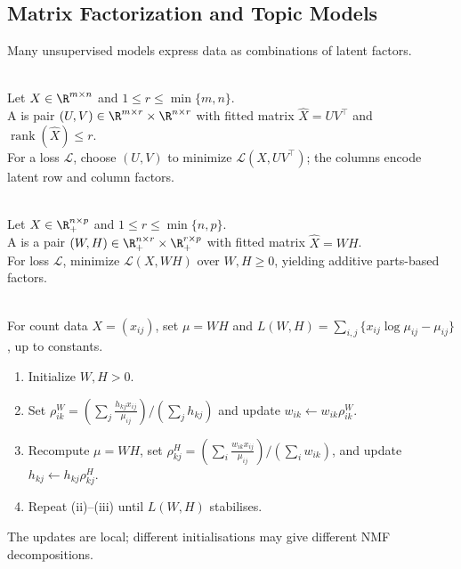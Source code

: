 \subsection{Matrix Factorization and Topic Models}

Many unsupervised models express data as combinations of latent factors.

\begin{definition} \label{def:sl-low-rank-matrix-factorization} \\
Let $X\in\R^{m\times n}$ and $1\leq r\leq\min\{m,n\}$.\\
A  is pair $(U,V)\in\R^{m\times r}\times\R^{n\times r}$ with fitted matrix $\widehat{X}=UV^\top$ and $\operatorname{rank}(\widehat{X})\leq r$.\\
For a loss $\mathcal{L}$, choose $(U,V)$ to minimize $\mathcal{L}(X,UV^\top)$; the columns encode latent row and column factors.
\end{definition}

\begin{definition} \label{def:sl-nonnegative-matrix-factorization} \\
Let $X\in\R_+^{n\times p}$ and $1\leq r\leq\min\{n,p\}$.\\
A  is a pair $(W,H)\in\R_+^{n\times r}\times\R_+^{r\times p}$ with fitted matrix $\widehat{X}=WH$.\\
For loss $\mathcal{L}$, minimize $\mathcal{L}(X,WH)$ over $W,H\geq0$, yielding additive parts-based factors.
\end{definition}

\begin{method} \label{meth:sl-poisson-nmf-multiplicative-updates} \\
For count data $X=(x_{ij})$, set $\mu=WH$ and $L(W,H)=\sum\limits_{i,j}\{x_{ij}\log\mu_{ij}-\mu_{ij}\}$, up to constants.
\begin{enumerate}[label=(\roman*)]
\setlength{\itemsep}{0pt}
\item Initialize $W,H>0$.
\item Set $\rho^W_{ik}=(\sum\limits_j \frac{h_{kj}x_{ij}}{\mu_{ij}})/(\sum\limits_j h_{kj})$ and update $w_{ik}\gets w_{ik}\rho^W_{ik}$.
\item Recompute $\mu=WH$, set $\rho^H_{kj}=(\sum\limits_i \frac{w_{ik}x_{ij}}{\mu_{ij}})/(\sum\limits_i w_{ik})$, and update $h_{kj}\gets h_{kj}\rho^H_{kj}$.
\item Repeat (ii)--(iii) until $L(W,H)$ stabilises.
\end{enumerate}
The updates are local; different initialisations may give different NMF decompositions.
\end{method}

